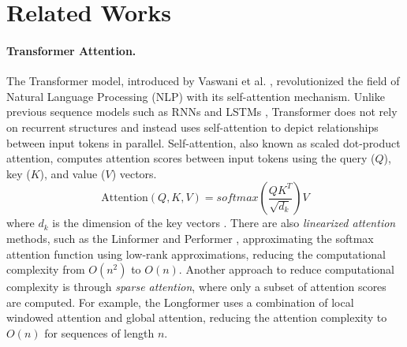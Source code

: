 \section{Related Works}
\paragraph{Transformer Attention.}
The Transformer model, introduced by Vaswani et al. \cite{vaswani2017attention}, revolutionized the field of Natural Language Processing (NLP) with its self-attention mechanism. Unlike previous sequence models such as RNNs and LSTMs \cite{graves2012long}, Transformer does not rely on recurrent structures and instead uses self-attention to depict relationships between input tokens in parallel.
Self-attention, also known as scaled dot-product attention, computes attention scores between input tokens using the query ($Q$), key ($K$), and value ($V$) vectors. 
\[
\text{Attention}(Q, K, V) = softmax\left(\frac{QK^T}{\sqrt{d_k}}\right)V
\]
where $d_k$ is the dimension of the key vectors \cite{vaswani2017attention}.
There are also \textit{linearized attention} methods, such as the Linformer \cite{wang2020linformer} and Performer \cite{choromanski2020rethinking}, approximating the softmax attention function using low-rank approximations, reducing the computational complexity from $O(n^2)$ to $O(n)$.
Another approach to reduce computational complexity is through \textit{sparse attention}, where only a subset of attention scores are computed. For example, the Longformer \cite{beltagy2020longformer} uses a combination of local windowed attention and global attention, reducing the attention complexity to $O(n)$ for sequences of length $n$.


